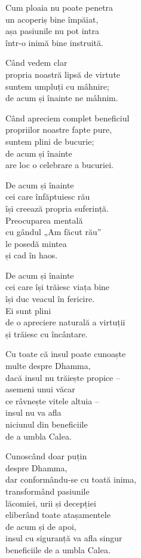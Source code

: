 Cum ploaia nu poate penetra\\
un acoperiș bine împăiat,\\
așa pasiunile nu pot intra\\
într-o inimă bine instruită.


Când vedem clar\\
propria noastră lipsă de virtute\\
suntem umpluți cu mâhnire;\\
de acum și înainte ne mâhnim.


Când apreciem complet beneficiul\\
propriilor noastre fapte pure,\\
suntem plini de bucurie;\\
de acum și înainte\\
are loc o celebrare a bucuriei.

De acum și înainte\\
cei care înfăptuiesc rău\\
își creează propria suferință.\\
Preocuparea mentală\\
cu gândul „Am făcut rău”\\
le posedă mintea\\
și cad în haos.


De acum și înainte\\
cei care își trăiesc viața bine\\
își duc veacul în fericire.\\
Ei sunt plini\\
de o apreciere naturală a virtuții\\
și trăiesc cu încântare.


Cu toate că insul poate cunoaște\\
multe despre Dhamma,\\
dacă insul nu trăiește propice –\\
asemeni unui văcar\\
ce râvnește vitele altuia –\\
insul nu va afla\\
niciunul din beneficiile\\
de a umbla Calea.


Cunoscând doar puțin\\
despre Dhamma,\\
dar conformându-se cu toată inima,\\
transformând pasiunile\\
lăcomiei, urii și decepției\\
eliberând toate atașamentele\\
de acum și de apoi,\\
insul cu siguranță va afla singur\\
beneficiile de a umbla Calea.
